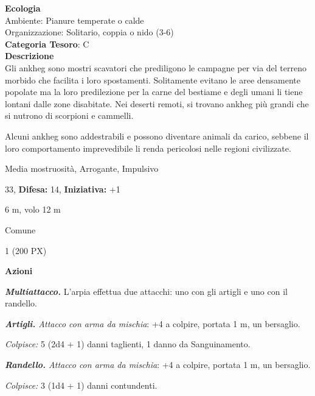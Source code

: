 \begin{multicols}{2}
{\textbf{Ecologia}\\
Ambiente: Pianure temperate o calde\\
Organizzazione: Solitario, coppia o nido (3-6)\\
\textbf{Categoria Tesoro}: C\\
\textbf{Descrizione}\\
Gli ankheg sono mostri scavatori che prediligono le campagne per via del terreno morbido che facilita i loro spostamenti. Solitamente evitano le aree densamente popolate ma la loro predilezione per la carne del bestiame e degli umani li tiene lontani dalle zone disabitate. Nei deserti remoti, si trovano ankheg più grandi che si nutrono di scorpioni e cammelli.

Alcuni ankheg sono addestrabili e possono diventare animali da carico, sebbene il loro comportamento imprevedibile li renda pericolosi nelle regioni civilizzate.

\begin{description}[noitemsep, topsep=0pt, parsep=0pt, partopsep=0pt, leftmargin=0cm, labelwidth=2.2cm]
	\item[\textbf{Taglia/Tipo:}] Media mostruosità, Arrogante, Impulsivo
	\item[\textbf{Caratt.:}] 
	\item[\textbf{Punti Ferita:}] 33,  \textbf{Difesa:} 14,  \textbf{Iniziativa:} +1
	\item[\textbf{Movimento:}] 6 m, volo 12 m
	\item[\textbf{Tiri Salvez.:}] 
	\item[\textbf{Linguaggi:}] Comune
	\item[\textbf{Sfida:}] 1 (200 PX)\smallskip
\end{description}

\textbf{Azioni}

\emph{\textbf{Multiattacco.}} L'arpia effettua due attacchi: uno con gli artigli e uno con il randello.

\emph{\textbf{Artigli.} Attacco con arma da mischia}: +4 a colpire, portata 1 m, un bersaglio.

\emph{Colpisce:} 5 (2d4 + 1) danni taglienti, 1 danno da Sanguinamento.

\emph{\textbf{Randello.} Attacco con arma da mischia}: +4 a colpire, portata 1 m, un bersaglio.

\emph{Colpisce:} 3 (1d4 + 1) danni contundenti.

}
\end{multicols}
